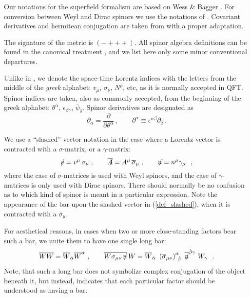 \documentclass[12pt]{revtex4}
\newcommand{\slashed}[1]{\hbox{{$#1$}\llap{$/$}}}
\begin{document}
Our notations for the superfield formalism are based on 
Wess \& Bagger 
\cite{Wess:1992cp}.
For conversion between Weyl and Dirac spinors we use the notations
of 
\cite{Martin:1997ns}.
Covariant derivatives and hermitean conjugation are taken from
\cite{Gates:1983nr}
with a proper adaptation.

The signature of the metric is 
$ (-+++) $.
All spinor algebra definitions can be found in the canonical treatment
\cite{Wess:1992cp},
and we list here only some minor conventional departures.

Unlike in \cite{Wess:1992cp}, we denote the space-time Lorentz
indices with the letters from the middle of the \emph{greek}
alphabet:
$ v_\mu $, $ \sigma_\nu $, $ N^\rho $, etc,
as it is normally accepted in QFT.
Spinor indices are taken, also as commonly accepted, from the
beginning of the greek alphabet:
$ \theta^\alpha $, $ \epsilon_{\beta\gamma} $, 
$ \overline{\psi}_{\dot\delta}$.
Spinor derivatives are designated as
\[
\partial_\alpha = \frac{\partial}{\partial\theta^\alpha}\,,
\qquad
\partial^\alpha \equiv \epsilon^{\alpha\beta}\partial_\beta
\,.
\]

We use a ``slashed'' vector notation in the case where a Lorentz
vector is contracted with a $ \sigma $-matrix, or a $ \gamma $-matrix:
\begin{equation}
\label{def_slashed}
\slashed{v} = v^\mu\, \sigma_\mu\;, \qquad
\overline{\slashed{A}} = A^\mu\, \overline{\sigma}_\mu\;, \qquad
\slashed{n} = n^\mu \gamma_\mu~~,
\end{equation}
where the case of $ \sigma $-matrices is used with Weyl spinors, and
the case of $ \gamma $-matrices is only used with Dirac spinors. 
There should normally be no confusion as to which kind of spinor is
meant in a particular expression.
Note the appearance of the bar upon the slashed vector in
(\ref{def_slashed}), when it
is contracted with a $ \overline{\sigma}_\mu $.

For aesthetical reasons, in cases when two or more close-standing
factors bear such a bar, we unite them to have one single 
long bar:
\[
\overline{W W} = \overline{W}_{\dot\alpha}
 \overline{W}^{\dot\alpha}~,
\qquad
\overline{W \sigma_{\mu\nu}\, \slashed{n}}\, W = 
\overline{W}_{\dot\alpha}\,\, 
\left(\overline{\sigma}_{\mu\nu}\right)
^{\dot\alpha}_{~\dot\beta}\,\,
\overline{\slashed{n}}^{\dot\beta \gamma}\,\,
W_\gamma~
~.
\]
Note, that such a long bar does not symbolize complex conjugation
of the object beneath it, but instead, indicates that each particular
factor should be understood as having a bar.
\end{document}

